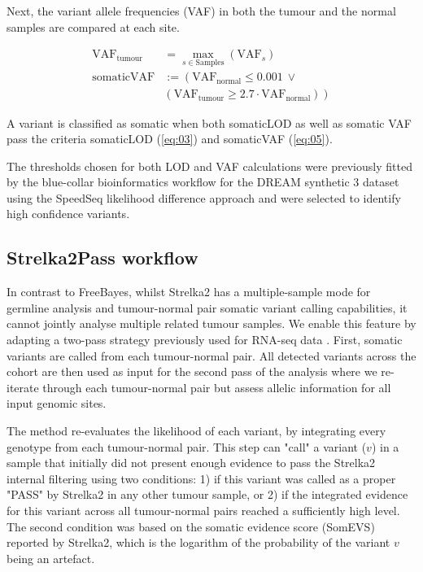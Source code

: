 Next, the variant allele frequencies (VAF) in both the tumour and the normal samples are compared at each site.


\begin{align}
\text{VAF}_{\text{tumour}} &= \max_{s \in \text{Samples}} ( \text{VAF}_s) \label{eq:04}\\
\text{somaticVAF} & := \left( \text{VAF}_{\text{normal}} \leq 0.001 ~\lor \right. \nonumber \\
 & \left. ( \text{VAF}_{\text{tumour}} \geq 2.7 \cdot \text{VAF}_{\text{normal}}) \right) \label{eq:05}
\end{align}

A variant is classified as somatic when both somaticLOD as well as somatic VAF pass the criteria somaticLOD (\autoref{eq:03}) and somaticVAF (\autoref{eq:05}).

The thresholds chosen for both LOD and VAF calculations were previously fitted by the blue-collar bioinformatics workflow for the DREAM synthetic 3 dataset using the SpeedSeq likelihood difference approach \parencite{Chapman2020} and were selected to identify high confidence variants.

\subsection{Strelka2Pass workflow}
In contrast to FreeBayes, whilst Strelka2 has a multiple-sample mode for germline analysis and tumour-normal pair somatic variant calling capabilities, it cannot jointly analyse multiple related tumour samples. We enable this feature by adapting a two-pass strategy previously used for RNA-seq data \parencite{Veeneman2015}. First, somatic variants are called from each tumour-normal pair. All detected variants across the cohort are then used as input for the second pass of the analysis where we re-iterate through each tumour-normal pair but assess allelic information for all input genomic sites.

The method re-evaluates the likelihood of each variant, by integrating every genotype from each tumour-normal pair. This step can "call" a variant ($v$) in a sample that initially did not present enough evidence to pass the Strelka2 internal filtering using two conditions: 1) if this variant was called as a proper "PASS" by Strelka2 in any other tumour sample, or 2) if the integrated evidence for this variant across all tumour-normal pairs reached a sufficiently high level. The second condition was based on the somatic evidence score (SomEVS) reported by Strelka2, which is the logarithm of the probability of the variant $v$ being an artefact.

